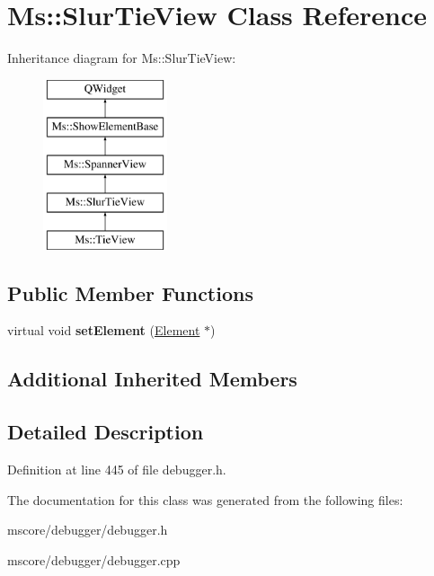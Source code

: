 \hypertarget{class_ms_1_1_slur_tie_view}{}\section{Ms\+:\+:Slur\+Tie\+View Class Reference}
\label{class_ms_1_1_slur_tie_view}
Inheritance diagram for Ms\+:\+:Slur\+Tie\+View\+:\begin{figure}[H]
\begin{center}
\leavevmode
\includegraphics[height=5.000000cm]{class_ms_1_1_slur_tie_view}
\end{center}
\end{figure}
\subsection*{Public Member Functions}
\begin{DoxyCompactItemize}
\item 
\mbox{\label{class_ms_1_1_slur_tie_view_ade34055994474d2adba52c4317d7f07b}} 
virtual void {\bfseries set\+Element} (\hyperlink{class_ms_1_1_element}{Element} $\ast$)
\end{DoxyCompactItemize}
\subsection*{Additional Inherited Members}


\subsection{Detailed Description}


Definition at line 445 of file debugger.\+h.



The documentation for this class was generated from the following files\+:\begin{DoxyCompactItemize}
\item 
mscore/debugger/debugger.\+h\item 
mscore/debugger/debugger.\+cpp\end{DoxyCompactItemize}
